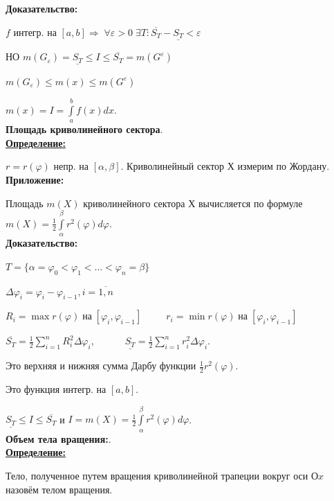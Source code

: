 \documentclass[a4paper,12pt]{article} %
\renewcommand {\leq}{\leqslant}
\begin{document}
\textbf{Доказательство:} 

$f$ интегр. на $[a, b] \Rightarrow \; \forall \varepsilon > 0 \; \exists T: \overline{S_T} - \underline{S_T} < \varepsilon$

НО $m(G_{\varepsilon}) = \underline{S_T} \leq I \leq \overline{S_T} = m(G^{\varepsilon}) $

$m(G_{\varepsilon}) \leq m(x) \leq m(G^{\varepsilon})$

$m(x) = I = \int\limits_a^b f(x)dx$.\\

\noindent \textbf{Площадь криволинейного сектора}.\\

\underline{\textbf{Определение:}}

$r=r(\varphi)$ непр. на $[\alpha, \beta]$. Криволинейный сектор $Х$ измерим по Жордану.\\

\textbf{Приложение:}

Площадь $m(X)$ криволинейного сектора $Х$ вычисляется по формуле $m(X) =  \frac{1}{2} \int\limits_{\alpha}^{\beta} r^2(\varphi)d\varphi$.\\

\textbf{Доказательство:}

$T = \{\alpha = \varphi_0 < \varphi_1 <\dots < \varphi_n = \beta\}$

$\Delta \varphi_i = \varphi_i - \varphi_{i-1}, i = \overline{1, n}$

$R_i = \max r(\varphi)\; на\; [\varphi_i, \varphi_{i-1}]\;\;\;\;\;\;\;\;\; r_i=\min r(\varphi)\; на\; [\varphi_i, \varphi_{i-1}] $

$\overline{S_T} = \frac{1}{2}\sum\limits_{i=1}^n R_i^2 \Delta \varphi_i,\;\;\;\;\;\;\;\;\;\;\; \underline{S_T} =\frac{1}{2}\sum\limits_{i=1}^n r_i^2 \Delta \varphi_i$.

Это верхняя и нижняя сумма Дарбу функции $\frac{1}{2}r^2(\varphi)$.

Это функция интегр. на $[a, b]$.

$\underline{S_T} \leq I \leq \overline{S_T}$ и $I = m(X) = \frac{1}{2}\int\limits_{\alpha}^{\beta}r^2(\varphi)d\varphi$.\\

\noindent \textbf{Объем тела вращения:}.\\

\underline{\textbf{Определение:}}

Тело, полученное путем вращения криволинейной трапеции вокруг оси $Оx$ назовём телом вращения.\\
\end{document}
